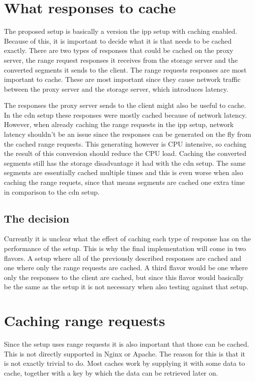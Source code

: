 \documentclass[twoside,openright]{uva-bachelor-thesis}
\begin{document}
\section{What responses to cache}
The proposed setup is basically a version the \gls{ipp} setup with
caching enabled. Because of this, it is important to decide what it is that
needs to be cached exactly. There are two types of responses that could be
cached on the proxy server, the range request responses it receives from the
storage server and the converted segments it sends to the client. The
range requests responses are most important to cache. These are most important
since they cause network traffic between the proxy server and the storage
server, which introduces latency.

The responses the proxy server sends to the client might also be useful to
cache. In the \gls{cdn} setup these responses were mostly cached because of
network latency. However, when already caching the range requests in the
\gls{ipp} setup, network latency shouldn't be an issue since the responses can
be generated on the fly from the cached range requests. This generating however
is CPU intensive, so caching the result of this conversion should reduce the CPU
load. Caching the converted segments still has the storage disadvantage it had
with the \gls{cdn} setup. The same segments are essentially cached multiple
times and this is even worse when also caching the range requets, since that
means segments are cached one extra time in comparison to the \gls{cdn} setup.


\subsection{The decision}
Currently it is unclear what the effect of caching each type of response has on
the performance of the setup. This is why the final implementation will come in two
flavors. A setup where all of the previously described responses are cached and
one where only the range requests are cached. A third flavor would be one where
only the responses to the client are cached, but since this flavor would
basically be the same as the \cdn setup it is not necessary when also testing
against that setup.




\section{Caching range requests}\label{sec:cachingrange}
Since the \ipp setup uses range requests it is also important that those
can be cached. This is not directly supported in Nginx or Apache. The reason for
this is that it is not exactly trivial to do. Most caches work by supplying it
with some data to cache, together with a key by which the data can be retrieved later
on.
\end{document}
